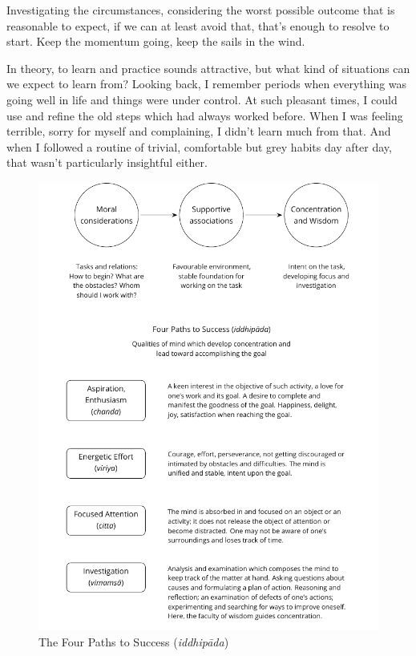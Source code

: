 Investigating the circumstances, considering the worst possible outcome
that is reasonable to expect, if we can at least avoid that, that's
enough to resolve to start. Keep the momentum going, keep the sails in
the wind.

In theory, to learn and practice sounds attractive, but what kind of
situations can we expect to learn from? Looking back, I remember periods
when everything was going well in life and things were under control. At
such pleasant times, I could use and refine the old steps which had
always worked before. When I was feeling terrible, sorry for myself and
complaining, I didn't learn much from that. And when I followed a
routine of trivial, comfortable but grey habits day after day, that
wasn't particularly insightful either.

\clearpage
\figurepagelayout

\begin{figure}[h]
\caption{The Four Paths to Success (\emph{iddhipāda})}\label{fig-success}
\bigskip
\includegraphics[width=0.95\linewidth]{./manuscript/tex/diagrams/paths-to-success.pdf}
\end{figure}

